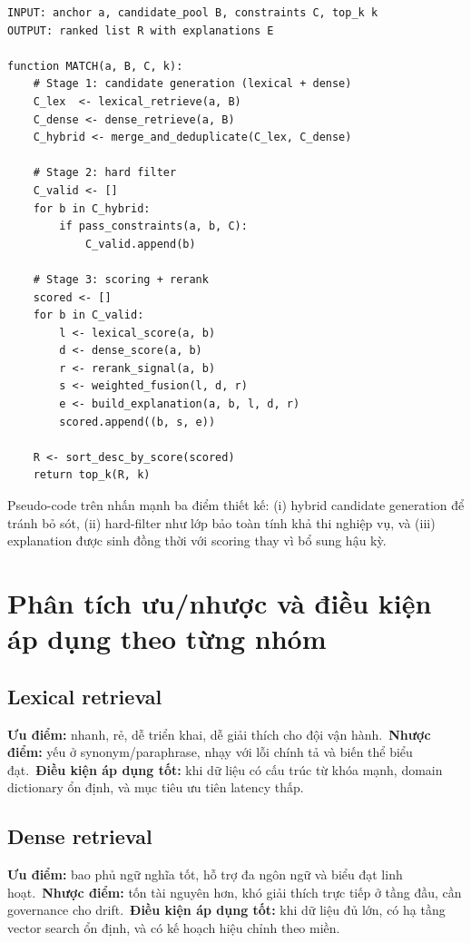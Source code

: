 \begin{lstlisting}[language={},caption={Pseudo-code pipeline so khớp CV--JD nhiều tầng (retrieval -> rerank)},label={lst:retrieval-rerank-pipeline}]
INPUT: anchor a, candidate_pool B, constraints C, top_k k
OUTPUT: ranked list R with explanations E

function MATCH(a, B, C, k):
    # Stage 1: candidate generation (lexical + dense)
    C_lex  <- lexical_retrieve(a, B)
    C_dense <- dense_retrieve(a, B)
    C_hybrid <- merge_and_deduplicate(C_lex, C_dense)

    # Stage 2: hard filter
    C_valid <- []
    for b in C_hybrid:
        if pass_constraints(a, b, C):
            C_valid.append(b)

    # Stage 3: scoring + rerank
    scored <- []
    for b in C_valid:
        l <- lexical_score(a, b)
        d <- dense_score(a, b)
        r <- rerank_signal(a, b)
        s <- weighted_fusion(l, d, r)
        e <- build_explanation(a, b, l, d, r)
        scored.append((b, s, e))

    R <- sort_desc_by_score(scored)
    return top_k(R, k)
\end{lstlisting}

Pseudo-code trên nhấn mạnh ba điểm thiết kế: (i) hybrid candidate generation để tránh bỏ sót, (ii) hard-filter như lớp bảo toàn tính khả thi nghiệp vụ, và (iii) explanation được sinh đồng thời với scoring thay vì bổ sung hậu kỳ.

\section{Phân tích ưu/nhược và điều kiện áp dụng theo từng nhóm}

\subsection{Lexical retrieval}

\textbf{Ưu điểm:} nhanh, rẻ, dễ triển khai, dễ giải thích cho đội vận hành.\
\textbf{Nhược điểm:} yếu ở synonym/paraphrase, nhạy với lỗi chính tả và biến thể biểu đạt.\
\textbf{Điều kiện áp dụng tốt:} khi dữ liệu có cấu trúc từ khóa mạnh, domain dictionary ổn định, và mục tiêu ưu tiên latency thấp.

\subsection{Dense retrieval}

\textbf{Ưu điểm:} bao phủ ngữ nghĩa tốt, hỗ trợ đa ngôn ngữ và biểu đạt linh hoạt.\
\textbf{Nhược điểm:} tốn tài nguyên hơn, khó giải thích trực tiếp ở tầng đầu, cần governance cho drift.\
\textbf{Điều kiện áp dụng tốt:} khi dữ liệu đủ lớn, có hạ tầng vector search ổn định, và có kế hoạch hiệu chỉnh theo miền.

